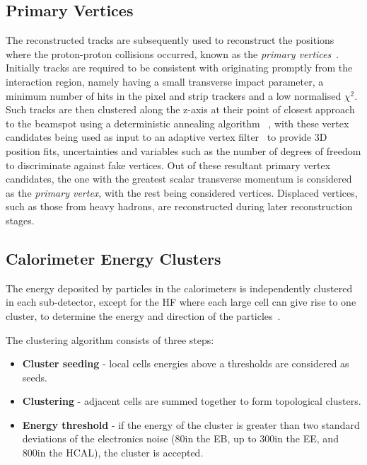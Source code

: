 \subsection{Primary Vertices}\label{subsec:vertices}
The reconstructed tracks are subsequently used to reconstruct the positions where the proton-proton collisions occurred, known as the \emph{primary vertices}~\cite{Speer:2006mh,Chatrchyan:2014fea}.
Initially tracks are required to be consistent with originating promptly from the interaction region, namely having a small transverse impact parameter, a minimum number of hits in the pixel and strip trackers and a low normalised $\chi^{2}$.
Such tracks are then clustered along the z-axis at their point of closest approach to the beamspot using a deterministic annealing algorithm	~\cite{Kenneth:1998i}, with these vertex candidates being used as input to an adaptive vertex filter~\cite{Fruhwirth:2007hz} to provide 3D position fits, uncertainties and variables such as the number of degrees of freedom to discriminate against fake vertices.
Out of these resultant primary vertex candidates, the one with the greatest scalar transverse momentum is considered as the \emph{primary vertex}, with the rest being considered \PU vertices.
Displaced vertices, such as those from heavy hadrons, are reconstructed during later reconstruction stages.

\subsection{Calorimeter Energy Clusters}\label{subsec:clustering}
The energy deposited by particles in the calorimeters is independently clustered in each sub-detector, except for the HF where each large cell can give rise to one cluster, to determine the energy and direction of the particles~\cite{CMS:2009nxa}.

The clustering algorithm consists of three steps:
\begin{itemize}
\item \textbf{Cluster seeding} - local cells energies above a thresholds are considered as seeds.
\item \textbf{Clustering} - adjacent cells are summed together to form topological clusters.
\item \textbf{Energy threshold} - if the energy of the cluster is greater than two standard deviations of the electronics noise (80\MeV in the EB, up to 300\MeV in the EE, and 800\MeV in the HCAL), the cluster is accepted.
\end{itemize}

